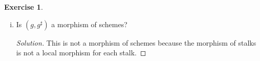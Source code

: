 \documentclass{article}
\renewcommand{\qedsymbol}{\raisebox{-0.5cm}{}}
\newcommand{\set}[1]{\left\{#1\right\}}
\newenvironment{solution}{\begin{proof}[Solution]\renewcommand\qedsymbol{}}{\end{proof}}
\theoremstyle{definition}
\newtheorem{question}{Exercise}
\begin{document}
\begin{question}
\begin{enumerate}[(i)]
              \begin{proof}
                  We first consider all opens in \(Y\) and look at their
                  preimages, the opens are \(\varnothing,\set{(0)},Y\). Their
                  inverse images under this map are \(\varnothing,\varnothing\)
                  and \(X\) respectively. Therefore we are looking for morphisms
                  \(g^{\sharp}\) such that the following diagram commutes:
                  \[
                      \begin{tikzcd}[ampersand replacement=\&]
                          {\Gamma(Y,O_{Y})=R} \&\& {K=\Gamma(X,O_{X})} \\
                          \\
                          {\Gamma(\set{(0)},O_{Y})=K} \&\& {0=\Gamma(\varnothing,O_{X})} \\
                          \\
                          {0=\Gamma(\varnothing,O_{Y})} \&\& {0=\Gamma(\varnothing,O_{X})}
                          \arrow["{f^{\sharp}_{Y}}", from=1-1, to=1-3]
                          \arrow[from=1-1, to=3-1]
                          \arrow[from=1-3, to=3-3]
                          \arrow[from=3-3, to=5-3]
                          \arrow[from=3-1, to=5-1]
                          \arrow["{g^{\sharp}_{\varnothing}}", from=5-1, to=5-3]
                          \arrow["{g^{\sharp}_{\set{(0)}}}", from=3-1, to=3-3]
                      \end{tikzcd}
                  \]
                  However because \(0\) is the terminal ring,
                  \(g^{\sharp}_{\set{(0)}}\) and \(g^{\sharp}_{\varnothing}\)
                  are the unique morphisms to this ring and these squares
                  commute trivially.
              \end{proof}

        \item Is \((g,g^{\sharp})\) a morphism of schemes?

              \begin{solution}
                  This is not a morphism of schemes because the morphism of
                  stalks is not a local morphism for each stalk.


\end{solution}
\end{enumerate}
\end{question}
\end{document}
